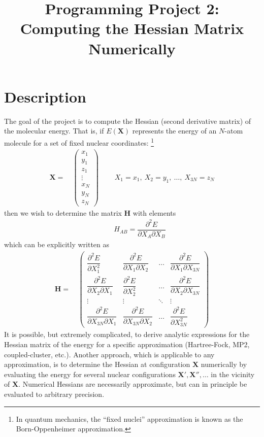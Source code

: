 \documentclass[11pt]{article}
\title{Programming Project 2: Computing the Hessian Matrix Numerically}
\date{}
\newcommand{\bo}[1]{\ensuremath{\mathbf{#1}}}
\renewcommand{\sp}{\ \ \ \ \ \ \ \ \ \ }
\newcommand{\pt}{\partial}
\newcommand{\fr}[2]{\dfrac{#1}{#2}}
\newcommand{\ma}[1]{\left(\begin{matrix}#1\end{matrix}\right)}
\begin{document}
\maketitle

\section*{Description}

The goal of the project is to compute the Hessian (second derivative matrix) of the molecular energy.
That is, if $E(\bo{X})$ represents the energy of an $N$-atom molecule for a set of fixed nuclear coordinates: \footnote{In quantum mechanics, the ``fixed nuclei'' approximation is known as the Born-Oppenheimer approximation.}
\begin{align}
	\bo{X} =&\ \ma{x_1\\y_1\\z_1\\\vdots\\x_N\\y_N\\z_N}\sp
	X_1=x_1,\ X_2=y_1,\ \ldots,\ X_{3N}=z_N
\end{align}
then we wish to determine the matrix $\bo{H}$ with elements
\begin{align}
	\sp H_{AB} = \fr{\pt^2E}{\pt X_A\pt X_B}
\end{align}
which can be explicitly written as
\begin{align}
	\bo{H} =&\ 
	\ma{
		\fr{\pt^2E}{\pt X_1^2}&\fr{\pt^2E}{\pt X_1\pt X_2}&\ldots&\fr{\pt^2E}{\pt X_1\pt X_{3N}}\\
		\fr{\pt^2E}{\pt X_2\pt X_1}&\fr{\pt^2E}{\pt X_2^2}&\ldots&\fr{\pt^2E}{\pt X_2\pt X_{3N}}\\
		\vdots&\vdots&\ddots&\vdots\\
		\fr{\pt^2E}{\pt X_{3N}\pt X_1}&\fr{\pt^2E}{\pt X_{3N}\pt X_2}&\ldots&\fr{\pt^2E}{\pt X_{3N}^2}}
	\label{H}
\end{align}
It is possible, but extremely complicated, to derive analytic expressions for the Hessian matrix of the energy for a specific approximation (Hartree-Fock, MP2, coupled-cluster, etc.).
Another approach, which is applicable to any approximation, is to determine the Hessian at configuration $\bo{X}$ numerically by evaluating the energy for several nuclear configurations $\bo{X}',\bo{X}'',\ldots$ in the vicinity of $\bo{X}$.
Numerical Hessians are necessarily approximate, but can in principle be evaluated to arbitrary precision.
\end{document}
